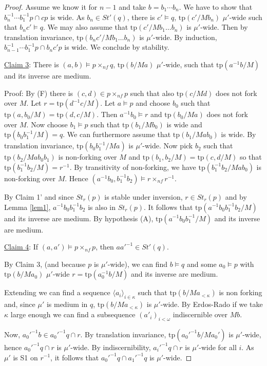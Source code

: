\documentclass[12pt]{article}
\theoremstyle{definition}
\theoremstyle{mystyle}
\theoremstyle{remark}
\newcommand{\tp}{\mathrm{tp}}
\newcommand{\nf}{\times_{nf}}
\begin{document}
\begin{proof}
Assume we know it for $n-1$ and take $b=b_1\cdots b_n$. We have to show that $b_n^{-1}\cdots b_1^{-1} p \cap cp$ is wide. As $b_n \in St'(q)$, there is $c'\models q$, $\tp(c'/Mb_n)$ $\mu'$-wide such that $b_n c' \models q$. We may also assume that $\tp(c'/Mb_1\ldots b_n)$ is $\mu'$-wide. Then by translation invariance, $\tp(b_nc'/Mb_1\ldots b_n)$ is $\mu'$-wide. By induction, $b_{n-1}^{-1}\cdots b_1^{-1} p \cap b_nc' p$ is wide. We conclude by stability.

\medskip \noindent
\underline{Claim 3}: There is $(a,b)\models p\nf q$, $\tp(b/Ma)$ $\mu'$-wide, such that $\tp(a^{-1}b/M)$ and its inverse are medium.

\noindent
Proof: By (F) there is $(c,d)\in p\nf p$ such that also $\tp(c/Md)$ does not fork over $M$. Let $r=\tp(d^{-1}c/M)$.
Let $a\models p$ and choose $b_0$ such that $\tp(a,b_0/M)=\tp(d, c/M)$. Then $a^{-1} b_0\models r$ and $\tp(b_0/Ma)$ does not fork over $M$.
Now choose $b_1\models p$ such that  $\tp(b_1/Mb_0)$ is wide and $\tp(b_0b_1^{-1}/M)=q$. We can furthermore assume that $\tp(b_1/Mab_0)$ is wide. By translation invariance, $\tp(b_0b_1^{-1}/Ma)$ is $\mu'$-wide. Now pick $b_2$ such that $\tp(b_2/Mab_0b_1)$ is non-forking over $M$ and $\tp(b_1,b_2/M) = \tp(c,d/M)$ so that $\tp(b_1^{-1}b_2/M)= r^{-1}$. By transitivity of non-forking, we have $\tp(b_1^{-1}b_2/Mab_0)$ is non-forking over $M$. Hence $(a^{-1}b_0,b_1^{-1}b_2)\models r \nf r^{-1}$.

By Claim 1' and since $St_r(p)$ is stable under inversion, $r\in
St_r(p)$ and by Lemma \ref{lem1}, $a^{-1}b_0b_1^{-1}b_2$ is also
in $St_r(p)$. It follows that $\tp(a^{-1}b_0b_1^{-1}b_2/M)$ and
its inverse are medium. By hypothesis (A),
$\tp(a^{-1}b_0b_1^{-1}/M)$ and its inverse are medium.

\medskip \noindent
\underline{Claim 4}: If $(a,a')\models p\nf p$, then $aa'^{-1}\in
St'(q)$.

\noindent By Claim 3, (and because $p$ is $\mu'$-wide), we can
find $b\models q$ and some $a_0\models p$ with $\tp(b/Ma_0)$
$\mu'$-wide $r= \tp(a_0^{-1}b/M)$ and its inverse are medium.

Extending we can find a sequence $\langle a_i\rangle_{i\in
\kappa}$ such that $\tp(b/Ma_{<\kappa})$ is non forking and, since
$\mu'$ is medium in $q$, $\tp(b/Ma_{<\kappa})$ is $\mu'$-wide. By
Erdos-Rado  if we take $\kappa$ large enough we can find a
subsequence $(a'_i)_{i<\omega}$ indiscernible over $Mb$.

Now, $a_0'^{-1}b \in a_0'^{-1}q\cap r$. By translation invariance,
$\tp(a_0'^{-1}b/Ma_0')$ is $\mu'$-wide, hence $a_0'^{-1}q \cap r$
is $\mu'$-wide. By indiscernibility, $a_i'^{-1}q \cap r$ is
$\mu'$-wide for all $i$. As $\mu'$ is S1 on $r^{-1}$, it follows
that $a_0'^{-1}q\cap a_1'^{-1}q$ is $\mu'$-wide.


\end{proof}
\end{document}
